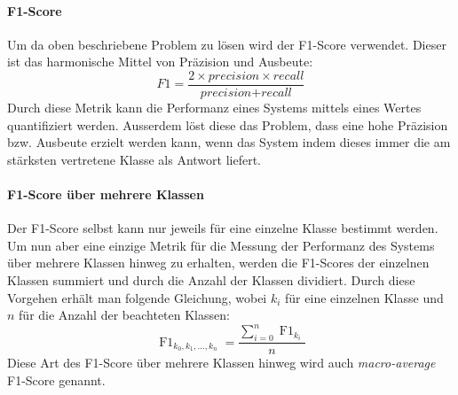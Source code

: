 \paragraph{F1-Score} Um da oben beschriebene Problem zu lösen wird der F1-Score verwendet. Dieser ist das harmonische Mittel von Präzision und Ausbeute:
\begin{equation}
\label{basic:metrics:f1_eq}
F1 = \frac{2 \times \textit{precision} \times recall}{\textit{precision} + \textit{recall}}
\end{equation}
Durch diese Metrik kann die Performanz eines Systems mittels eines Wertes quantifiziert werden. Ausserdem löst diese das Problem, dass eine hohe Präzision bzw. Ausbeute erzielt werden kann, wenn das System  indem dieses immer die am stärksten vertretene Klasse als Antwort liefert.
\paragraph{F1-Score über mehrere Klassen} Der F1-Score selbst kann nur jeweils für eine einzelne Klasse bestimmt werden. Um nun aber eine einzige Metrik für die Messung der Performanz des Systems über mehrere Klassen hinweg zu erhalten, werden die F1-Scores der einzelnen Klassen summiert und durch die Anzahl der Klassen dividiert. Durch diese Vorgehen erhält man folgende Gleichung, wobei $k_i$ für eine einzelnen Klasse und $n$ für die Anzahl der beachteten Klassen:
\begin{equation}
\operatorname{F1}_{k_0, k_1, \dots, k_n} = \frac{\sum_{i=0}^{n} \operatorname{F1}_{k_i}}{n}
\end{equation}
Diese Art des F1-Score über mehrere Klassen hinweg wird auch \emph{macro-average} F1-Score genannt.



